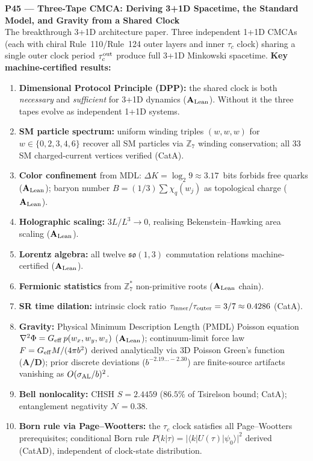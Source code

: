 \documentclass[11pt]{article}
\newcommand{\CatAL}{\ensuremath{\textbf{A}_{\rm Lean}}}
\newcommand{\CatAD}{\textbf{A/D}}
\begin{document}
\medskip
\noindent\textbf{P45 — Three-Tape CMCA: Deriving 3+1D Spacetime, the Standard Model, and Gravity from a Shared Clock}~\cite{SpivackThreeTapeCMCA}\\
The breakthrough 3+1D architecture paper.  Three independent 1+1D CMCAs (each with
chiral Rule~110/Rule~124 outer layers and inner $\tau_c$ clock) sharing a single
outer clock period $\tau_c^{\rm out}$ produce full 3+1D Minkowski spacetime.
\textbf{Key machine-certified results:}
\begin{enumerate}[noitemsep,topsep=2pt]
\item \textbf{Dimensional Protocol Principle (DPP):} the shared clock is both
  \emph{necessary} and \emph{sufficient} for 3+1D dynamics ($\CatAL$).
  Without it the three tapes evolve as independent 1+1D systems.
\item \textbf{SM particle spectrum:} uniform winding triples $(w,w,w)$ for
  $w \in \{0,2,3,4,6\}$ recover all SM particles via $\mathbb{Z}_7$ winding
  conservation; all 33 SM charged-current vertices verified (CatA).
\item \textbf{Color confinement} from MDL: $\Delta K = \log_2 9 \approx 3.17$~bits
  forbids free quarks ($\CatAL$); baryon number $B = (1/3)\sum\chi_q(w_j)$ as
  topological charge ($\CatAL$).
\item \textbf{Holographic scaling:} $3L/L^3 \to 0$, realising Bekenstein--Hawking
  area scaling ($\CatAL$).
\item \textbf{Lorentz algebra:} all twelve $\mathfrak{so}(1,3)$ commutation
  relations machine-certified ($\CatAL$).
\item \textbf{Fermionic statistics} from $\mathbb{Z}_7^*$ non-primitive roots ($\CatAL$
  chain).
\item \textbf{SR time dilation:} intrinsic clock ratio $\tau_{\rm inner}/\tau_{\rm outer}
  = 3/7 \approx 0.4286$ (CatA).
\item \textbf{Gravity:} Physical Minimum Description Length (PMDL) Poisson equation $\nabla^2\Phi = G_{\rm eff}\,p(w_x,w_y,w_z)$
  ($\CatAL$); continuum-limit force law $F = G_{\rm eff}M/(4\pi b^2)$ derived analytically
  via 3D Poisson Green's function (\CatAD); prior discrete deviations ($b^{-2.19\ldots-2.30}$)
  are finite-source artifacts vanishing as $O(\sigma_{\rm AL}/b)^2$.
\item \textbf{Bell nonlocality:} CHSH $S = 2.4459$ ($86.5\%$ of Tsirelson bound; CatA);
  entanglement negativity $\mathcal{N} = 0.38$.
\item \textbf{Born rule via Page--Wootters:} the $\tau_c$ clock satisfies all
  Page--Wootters prerequisites; conditional Born rule $P(k|\tau) = |\langle k|U(\tau)|\psi_0\rangle|^2$
  derived (CatAD), independent of clock-state distribution.
\end{enumerate}
\end{document}
